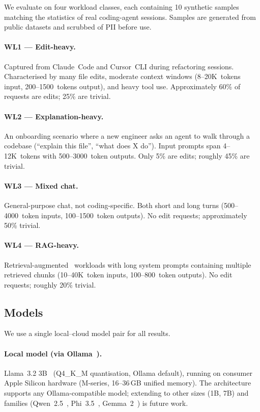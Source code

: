 \documentclass[11pt,a4paper]{article}
\begin{document}
We evaluate on four workload classes, each containing 10 synthetic
samples matching the statistics of real coding-agent sessions. Samples
are generated from public datasets and scrubbed of PII before use.

\paragraph{WL1 --- Edit-heavy.}
Captured from Claude~Code and Cursor~CLI during refactoring sessions.
Characterised by many file edits, moderate context windows
(8--20K~tokens input, 200--1500~tokens output), and heavy tool use.
Approximately 60\% of requests are edits; 25\% are trivial.

\paragraph{WL2 --- Explanation-heavy.}
An onboarding scenario where a new engineer asks an agent to walk
through a codebase (``explain this file'', ``what does X do''). Input
prompts span 4--12K~tokens with 500--3000~token outputs. Only 5\% are
edits; roughly 45\% are trivial.

\paragraph{WL3 --- Mixed chat.}
General-purpose chat, not coding-specific. Both short and long turns
(500--4000~token inputs, 100--1500~token outputs). No edit requests;
approximately 50\% trivial.

\paragraph{WL4 --- RAG-heavy.}
Retrieval-augmented~\cite{lewis2020rag} workloads with long system
prompts containing multiple retrieved chunks (10--40K~token inputs,
100--800~token outputs). No edit requests; roughly 20\% trivial.

\subsection{Models}
\label{sec:models}

We use a single local--cloud model pair for all results.

\paragraph{Local model (via Ollama~\cite{ollama}).}
Llama~3.2 3B~\cite{llama3} (Q4\_K\_M quantisation, Ollama default),
running on consumer Apple Silicon hardware (M-series, 16--36\,GB
unified memory). The architecture supports any Ollama-compatible
model; extending to other sizes (1B, 7B) and families
(Qwen~2.5~\cite{qwen25}, Phi~3.5~\cite{phi3}, Gemma~2~\cite{gemma})
is future work.
\end{document}
